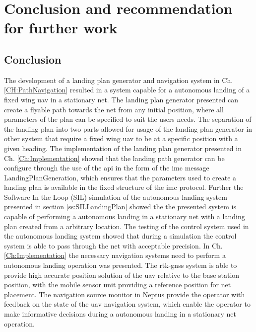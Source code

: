 \chapter{Conclusion and recommendation for further work}
\section{Conclusion}
The development of a landing plan generator and navigation system in Ch. \ref{CH:PathNavigation} resulted in a system capable for a autonomous landing of a fixed wing \gls{uav} in a stationary net. The landing plan generator presented can create a flyable path towards the net from any initial position, where all parameters of the plan can be specified to suit the users needs. The separation of the landing plan into two parts allowed for usage of the landing plan generator in other system that require a fixed wing \gls{uav} to be at a specific position with a given heading. The implementation of the landing plan generator presented in Ch. \ref{Ch:Implementation} showed that the landing path generator can be configure through the use of the \gls{api} in the form of the \gls{imc} message LandingPlanGeneration, which ensures that the parameters used to create a landing plan is available in the fixed structure of the \gls{imc} protocol. Further the Software In the Loop (SIL) simulation of the autonomous landing system presented in section \ref{ss:SILLandingPlan} showed the the presented system is capable of performing a autonomous landing in a stationary net with a landing plan created from a arbitrary location. The testing of the control system used in the autonomous landing system showed that during a simulation the control system is able to pass through the net with acceptable precision.
In Ch. \ref{Ch:Implementation} the necessary navigation systems need to perform a autonomous landing operation was presented. The \gls{rtk-gnss} system is able to provide high accurate position solution of the \gls{uav} relative to the base station position, with the mobile sensor unit providing a reference position for net placement. The navigation source monitor in Neptus provide the operator with feedback on the state of the \gls{uav} navigation system, which enable the operator to make informative decisions during a autonomous landing in a stationary net operation.
